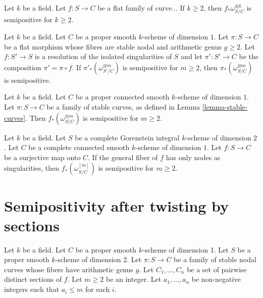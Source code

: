 \begin{lemma}
Let $k$ be a field.
Let $f : S \to C$ be a flat family of curve...
If $k \geq 2$, then $f_*\omega_{S/C}^{\otimes k}$ is semipositive for $k \geq 2$.
\end{lemma}

\begin{lemma}
\label{lemma-stable-curves-semipositive-resolve}
Let $k$ be a field.
Let $C$ be a proper smooth $k$-scheme of dimension $1$.
Let $\pi : S \to C$ be a flat morphism whose fibres are stable nodal and arithmetic
genus $g \geq 2$.
Let $f : S' \to S$ is a resolution of the isolated singularities of $S$
and let $\pi' : S' \to C$ be the composition $\pi' = \pi \circ f$.
If $\pi'_*(\omega_{S'/C}^{\otimes m})$ is semipositive for $m \geq 2$, then
$\pi_*(\omega_{S/C}^{\otimes m})$ is semipositive.
\end{lemma}

\begin{lemma}[cf.\ {\cite[Theorem 4.3]{Ko90}}]
\label{lemma-stable-curves-semipositive}
Let $k$ be a field.
Let $C$ be a proper connected smooth $k$-scheme of dimension $1$.
Let $\pi : S \to C$ be a family of stable curves,
as defined in Lemma \ref{lemma-stable-curves}.
Then $f_*(\omega_{S/C}^{\otimes m})$ is semipositive for $m \geq 2$.
\end{lemma}

\begin{theorem}[cf.\ {\cite[Theorem 4.3]{Ko90}}]
\label{theorem-kollar-theorem-4.3}
Let $k$ be a field.
Let $S$ be a complete Gorenstein integral $k$-scheme of dimension $2$.
Let $C$ be a complete connected smooth $k$-scheme of dimension $1$.
Let $f : S \to C$ be a surjective map onto $C$.
If the general fiber of $f$ has only nodes as singularities, %
then $f_*(\omega_{S/C}^{[m]})$ is semipositive for $m \ge 2$. 
\end{theorem}








\section{Semipositivity after twisting by sections}

\begin{situation}\label{kollar_prop_4.7}
Let $k$ be a field.
Let $C$ be a proper smooth $k$-scheme of dimension 1.
Let $S$ be a proper smooth $k$-scheme of dimension 2.
Let $\pi:S\to C$ be a family of stable nodal curves whose fibers have arithmetic genus $g$.
Let $C_1,\ldots,C_n$ be a set of pairwise distinct sections of $f$.
Let $m\ge2$ be an integer.
Let $a_1,\ldots,a_n$ be non-negative integers such that $a_i\le m$ for each $i$.
\end{situation}

